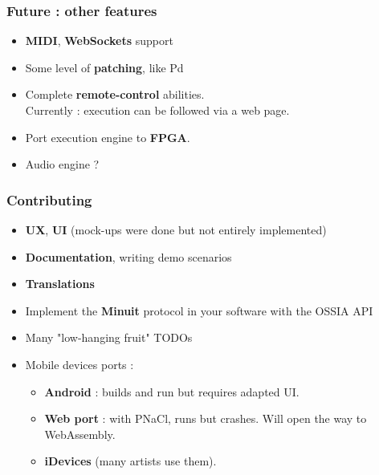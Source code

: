 \documentclass{beamer}
\begin{document}
\begin{frame}
    \frametitle{Future : other features}
    \Large
    \begin{itemize}
        \setlength\itemsep{1em}
    \item \textbf{MIDI}, \textbf{WebSockets} support
    \item Some level of \textbf{patching}, like Pd
    \item Complete \textbf{remote-control} abilities.\\ Currently : execution can be followed via a web page.
    \item Port execution engine to \textbf{FPGA}. 
    \item Audio engine ? 
    \end{itemize}
\end{frame}

\begin{frame}
    \frametitle{Contributing}   
    \large 
    \begin{itemize}
        \setlength\itemsep{1em}
    \item \textbf{UX}, \textbf{UI} (mock-ups were done but not entirely implemented)
    \item \textbf{Documentation}, writing demo scenarios
    \item \textbf{Translations}    
    \item Implement the \textbf{Minuit} protocol in your software with the OSSIA API    
    \item Many "low-hanging fruit" TODOs
    \item Mobile devices ports : 
    \begin{itemize}
        \item \textbf{Android} : builds and run but requires adapted UI.
        \item \textbf{Web port} : with PNaCl, runs but crashes. Will open the way to WebAssembly. 
        \item \textbf{iDevices} (many artists use them).
    \end{itemize}
\end{itemize}
    
\end{frame}
\end{document}
